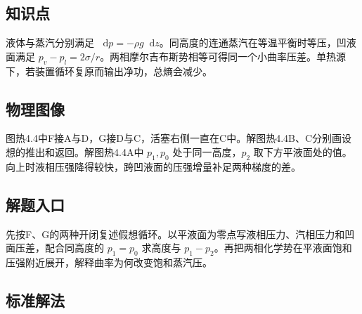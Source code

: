 \documentclass[UTF8,fontset=fandol,a4paper,11pt]{ctexart}
\newcommand{\dd}{\mathop{}\!\mathrm{d}}
\begin{document}


\subsection*{知识点}

液体与蒸汽分别满足 $\dd p=-\rho g\dd z$。同高度的连通蒸汽在等温平衡时等压，凹液面满足 $p_v-p_l=2\sigma/r$。两相摩尔吉布斯势相等可得同一个小曲率压差。单热源下，若装置循环复原而输出净功，总熵会减少。




\subsection*{物理图像}

图热4.4中F接A与D，G接D与C，活塞右侧一直在C中。解图热4.4B、C分别画设想的推出和返回。解图热4.4A中 $p_1,p_0$ 处于同一高度，$p_2$ 取下方平液面处的值。向上时液相压强降得较快，跨凹液面的压强增量补足两种梯度的差。



\subsection*{解题入口}

先按F、G的两种开闭复述假想循环。以平液面为零点写液相压力、汽相压力和凹面压差，配合同高度的 $p_1=p_0$ 求高度与 $p_1-p_2$。再把两相化学势在平液面饱和压强附近展开，解释曲率为何改变饱和蒸汽压。




\subsection*{标准解法}
\end{document}
